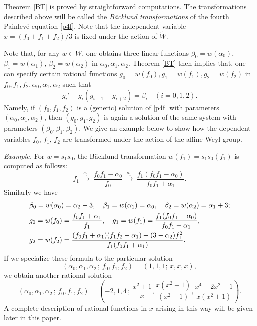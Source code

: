 \medskip\noindent
Theorem \ref{BT} is proved by straightforward computations.  
The transformations described above will be called the 
{\it B\"acklund transformations} of the fourth Painlev\'e 
equation \eqref{p4f}. 
Note that the independent variable $x=(f_0+f_1+f_2)/3$ is fixed 
under the action of $\widetilde{W}$. 
\par\medskip
Note that, for any $w\in W$, 
one obtains three linear functions 
$\beta_0=w(\alpha_0)$, $\beta_1=w(\alpha_1)$, 
$\beta_2=w(\alpha_2)$ in $\alpha_0,\alpha_1,\alpha_2$. 
Theorem \ref{BT} then implies that, one can specify certain 
rational functions 
$g_0=w(f_0), g_1=w(f_1), g_2=w(f_2)$ in 
$f_0,f_1,f_2,\alpha_0,\alpha_1,\alpha_2$ such that 
\begin{equation}
g_i' + g_i(g_{i+1}-g_{i+2})=\beta_i\quad(i=0,1,2). 
\end{equation} 
Namely, if $(f_0,f_1,f_2)$ is a (generic) solution of \eqref{p4f} with 
parameters $(\alpha_0,\alpha_1,\alpha_2)$, then  
$(g_0, g_1, g_2)$ is again a solution of the same system with 
parameters $(\beta_0,\beta_1,\beta_2)$. 
We give an example below to show how the dependent variables 
$f_0$, $f_1$, $f_2$ are transformed under the action of the 
affine Weyl group.  
\par\medskip
\noindent
{\em Example.}\quad
For $w=s_1s_0$, the B\"acklund transformation 
$w(f_1)=s_1s_0(f_1)$ is computed as follows:
\begin{equation}
f_1 \ {\overset {s_0.} \longrightarrow } \ 
\frac{f_0f_1-\alpha_0}{f_0} \  
{\overset {s_1.} \longrightarrow } \ 
\frac{f_1(f_0f_1-\alpha_0)}
{f_0f_1+\alpha_1}. 
\end{equation}
Similarly we have
\begin{equation}
\begin{align}
&\beta_0=w(\alpha_0)=\alpha_2-3,\quad
\beta_1=w(\alpha_1)=\alpha_0,\quad
\beta_2=w(\alpha_2)=\alpha_1+3; \notag\\
&g_0=w(f_0)=\frac{f_0f_1+\alpha_1}{f_1},\quad
g_1=w(f_1)=\frac{f_1(f_0f_1-\alpha_0)}{f_0f_1+\alpha_1},\\
&g_2=w(f_2)=
\frac{(f_0f_1+\alpha_1)(f_1f_2-\alpha_1)+(3-\alpha_2)f_1^2}
{f_1(f_0 f_1+\alpha_1)}.\notag
\end{align}
\end{equation}
If we specialize these formula to the particular solution 
\begin{equation}\label{ratsol1}
(\alpha_0,\alpha_1,\alpha_2\,;\, f_0,f_1,f_2) =(1,1,1;\,x,x,x), 
\end{equation}
we obtain another rational solution
\begin{equation}\label{ratsol2}
(\alpha_0,\alpha_1,\alpha_2\,;\, f_0,f_1,f_2)= 
(-2,1,4 \,;\, \frac{x^2+1}{x},\frac{x(x^2-1)}{(x^2+1)},
\frac{x^4+2 x^2-1}{x(x^2+1)}).
\end{equation}
A complete description of rational functions in $x$ arising in this way 
will be given later in this paper. 

